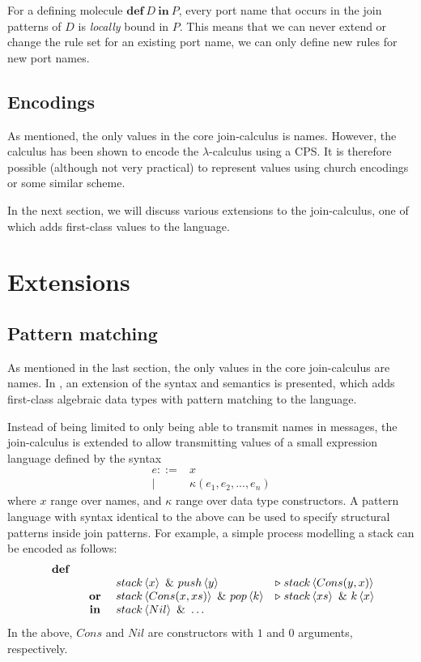 For a defining molecule $\mathbf{def}~D~\mathbf{in}~P$, every port name that
occurs in the join patterns of $D$ is \emph{locally} bound in $P$. This means
that we can never extend or change the rule set for an existing port name, we
can only define new rules for new port names.

\subsection{Encodings}

As mentioned, the only values in the core join-calculus is names. However, the
calculus has been shown to encode the $\lambda$-calculus using a
CPS\cite{fournet1996reflexive}. It is therefore possible (although not very
practical) to represent values using church encodings or some similar scheme.

In the next section, we will discuss various extensions to the join-calculus,
one of which adds first-class values to the language.


\section{Extensions}

\subsection{Pattern matching}
As mentioned in the last section, the only values in the core join-calculus are
names. In \cite{MaMa2008AlgPat}, an extension of the syntax and semantics is
presented, which adds first-class algebraic data types with pattern matching to
the language.

Instead of being limited to only being able to transmit names in messages, the
join-calculus is extended to allow transmitting values of a small expression
language defined by the syntax
\begin{align*}
 e ::={}& x \\
  |\quad{}& \kappa(e_1, e_2, ..., e_n)
\end{align*}
where $x$ range over names, and $\kappa$ range over data type constructors. A
pattern language with syntax identical to the above can be used to specify
structural patterns inside join patterns. For example, a simple process
modelling a stack can be encoded as follows:
\begin{displaymath}
\begin{array}{rcll}
\defJ &&&
\\ & &   \atm stack<x> \andJ \atm push<y> &\toJ{} \atm stack<Cons(y,x)>
\\&\orJ&  \atm stack<Cons(x, xs)> \andJ \atm pop<k>& \toJ{} \atm stack<xs> \andJ \atm k<x>
\\&\inJ& \atm stack<Nil> \andJ \ldots
\end{array}
\end{displaymath}
In the above, $Cons$ and $Nil$ are constructors with $1$ and $0$ arguments,
respectively.

